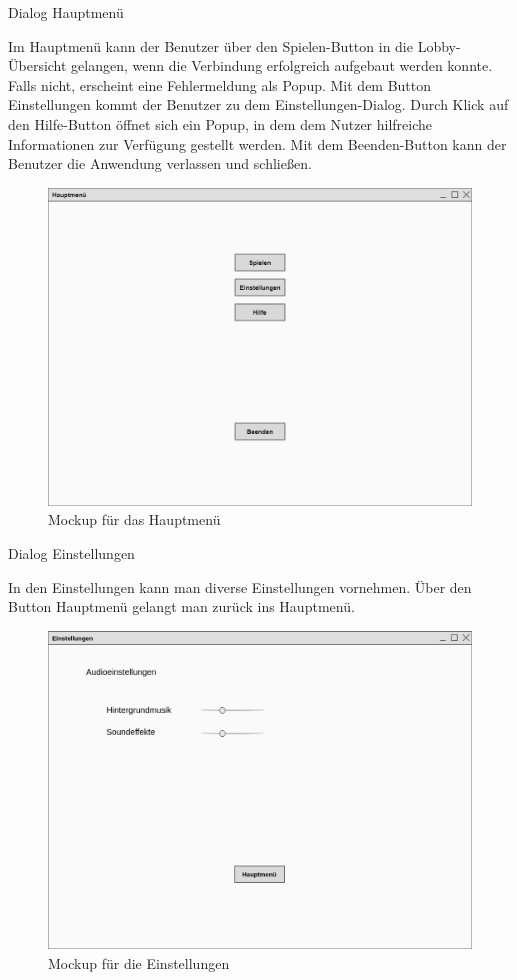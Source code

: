 Dialog \glqq{}Hauptmenü\grqq{}

Im Hauptmenü kann der Benutzer über den Spielen-Button in die Lobby-Übersicht gelangen, wenn die Verbindung erfolgreich aufgebaut werden konnte. Falls nicht, erscheint eine Fehlermeldung als Popup. Mit dem Button Einstellungen kommt der Benutzer zu dem Einstellungen-Dialog. Durch Klick auf den Hilfe-Button öffnet sich ein Popup, in dem dem Nutzer hilfreiche Informationen zur Verfügung gestellt werden. Mit dem Beenden-Button kann der Benutzer die Anwendung verlassen und schließen.

\begin{figure}[H]
  \centering
  \includegraphics[width=\textwidth]{Meilenstein03/Hauptmenue_Mockup.png}
  \caption{Mockup für das Hauptmenü}
\end{figure}

Dialog \glqq{}Einstellungen\grqq{}

In den Einstellungen kann man diverse Einstellungen vornehmen. Über den Button Hauptmenü gelangt man zurück ins Hauptmenü.

\begin{figure}[H]
  \centering
  \includegraphics[width=\textwidth]{Meilenstein03/Einstellungen_Mockup.png}
  \caption{Mockup für die Einstellungen}
\end{figure}

